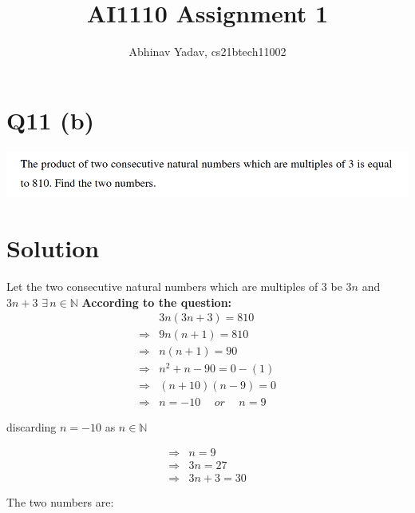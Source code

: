 \documentclass[11pt, a4paper]{article}
\title{AI1110 Assignment 1}
\author{Abhinav Yadav, cs21btech11002}
\begin{document}
    \maketitle
    \section*{Q11 (b)}
    \includegraphics[width=\textwidth]{q11_b.png}
    \section*{Solution}
    Let the two consecutive natural numbers which are multiples of $3$ be $3n$ and $3n+3$
    \hspace{5pt} $\exists \hspace{2pt} n \in \mathbb{N}$
    \textbf{According to the question:}\\
    \begin{align*}
        & 3n(3n+3) = 810\\
        \Rightarrow & 9n(n+1)=810\\
        \Rightarrow & n(n+1)=90\\
        \Rightarrow & n^2+n-90=0\hspace{0pt} -(1)\\
        \Rightarrow & (n+10)(n-9)=0\\
        \Rightarrow & n=-10 \hspace{15pt} or \hspace{15pt} n=9
    \end{align*}
    \begin{center}
        discarding $n=-10$ as $n \in \mathbb{N}$
    \end{center}
    \begin{equation*}
        \begin{split}
            \Rightarrow & n=9\\
            \Rightarrow & 3n=27\\
            \Rightarrow & 3n+3=30\\\\
        \end{split}
    \end{equation*} 
    The two numbers are:\\
    \pagebreak
\end{document}
